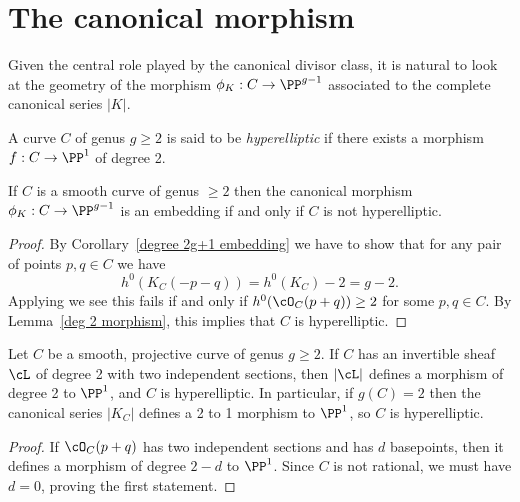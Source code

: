 \section{The canonical morphism}

Given the central role played by the canonical divisor class, it is natural to look at the geometry of the morphism $\phi_K : C \to \PP^{g-1}$ associated to the complete canonical series $|K|$.  

\begin{definition}
A curve $C$ of genus $g \geq 2$ is said to be \emph{hyperelliptic} if there exists a morphism $f: C \to \PP^1$ of degree 2. \end{definition}

\begin{theorem}\label{canonical system is very ample}
If $C$ is a smooth curve of genus $\geq 2$ then the canonical morphism $\phi_K : C \to \PP^{g-1}$ is an embedding if and only if $C$ is not hyperelliptic.
\end{theorem}

\begin{proof}
By Corollary~\ref{degree 2g+1 embedding} we have to show that for any pair of points $p, q \in C$ we have
$$
h^0(K_C(-p-q)) = h^0(K_C)-2 = g-2.
$$
Applying \trr we see this fails if and only if $h^0(\cO_C(p+q)) \geq 2$ for some $p,q \in C$. By Lemma~\ref{deg 2 morphism}, this implies that $C$ is hyperelliptic.
\end{proof}

\begin{lemma}\label{deg 2 morphism}
Let $C$ be a smooth, projective curve of genus $g\geq 2$. If $C$ has an invertible sheaf $\cL$ of degree 2 with two independent sections, then
$|\cL|$ defines a morphism of degree 2 to $\PP^{1}$, and $C$ is hyperelliptic. In particular, if $g(C) = 2$ then the canonical series $|K_{C}|$ defines a 2 to 1 morphism to $\PP^{1}$, so $C$ is hyperelliptic.
\end{lemma}

\begin{proof}
If $\cO_C(p+q)$ has two independent sections and has $d$ basepoints, then it defines a morphism of degree $2-d$ to $\PP^1$. Since $C$ is not rational,
we must have $d=0$, proving the first statement. 
\end{proof}

